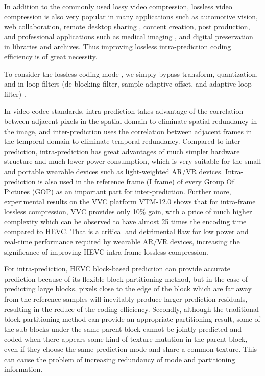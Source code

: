 \documentclass[journal]{IEEEtran}
\begin{document}
In addition to the commonly used lossy video compression, lossless video compression is also very popular in many applications such as automotive vision, web collaboration, remote desktop sharing \cite{04}, content creation, post production, and professional applications such as medical imaging \cite{05}, and digital preservation in libraries and archives. Thus improving lossless intra-prediction coding efficiency is of great necessity.

To consider the lossless coding mode \cite{06}, we simply bypass transform, quantization, and in-loop filters (de-blocking filter, sample adaptive offset, and adaptive loop filter) \cite{07}.

In video codec standards, intra-prediction takes advantage of the correlation between adjacent pixels in the spatial domain to eliminate spatial redundancy in the image, and inter-prediction uses the correlation between adjacent frames in the temporal domain to eliminate temporal redundancy. Compared to inter-prediction, intra-prediction has great advantages of much simpler hardware structure and much lower power consumption, which is very suitable for the small and portable wearable devices such as light-weighted AR/VR devices. Intra-prediction is also used in the reference frame (I frame) of every Group Of Pictures (GOP) as an important part for inter-prediction. Further more, experimental results on the VVC platform VTM-12.0 shows that for intra-frame lossless compression, VVC provides only 10\% gain, with a price of much higher complexity which can be observed to have almost 25 times the encoding time compared to HEVC. That is a critical and detrimental flaw for low power and real-time performance required by wearable AR/VR devices, increasing the significance of improving HEVC intra-frame lossless compression. 

For intra-prediction, HEVC block-based prediction can provide accurate prediction because of its flexible block partitioning method, but in the case of predicting large blocks, pixels close to the edge of the block which are far away from the reference samples will inevitably produce larger prediction residuals, resulting in the reduce of the coding efficiency. Secondly, although the traditional block partitioning method can provide an appropriate partitioning result, some of the sub blocks under the same parent block cannot be jointly predicted and coded when there appears some kind of texture mutation in the parent block, even if they choose the same prediction mode and share a common texture. This can cause the problem of increasing redundancy of mode and partitioning information.
\end{document}
